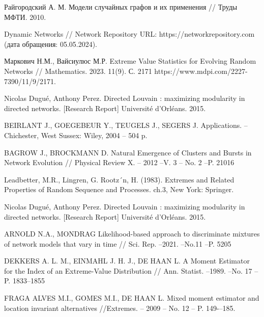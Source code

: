 \documentclass[a4paper,12pt]{article}
\begin{document}
\begin{thebibliography}{0}
 Райгородский А. М. Модели случайных графов и их применения // Труды МФТИ. 2010.

 Dynamic Networks // Network Repository URL: https://networkrepository.com (дата обращения: 05.05.2024).

 Маркович Н.М., Вайсиулюс М.Р. Extreme Value Statistics for Evolving Random Networks // Mathematics. 2023. 11(9). С. 2171 https://www.mdpi.com/2227-7390/11/9/2171.

 Nicolas Dugué, Anthony Perez. Directed Louvain : maximizing modularity in directed networks. [Research Report] Université d'Orléans. 2015.

 BEIRLANT J., GOEGEBEUR Y., TEUGELS J., SEGERS J. Applications. – Chichester, West Sussex: Wiley, 2004 – 504 p.

 BAGROW J., BROCKMANN D. Natural Emergence of Clusters and Bursts in Network Evolution // Physical Review X. – 2012 –V. 3 – No. 2 –P. 21016

 Leadbetter, M.R., Lingren, G. Rootz´n, H. (1983). Extremes and Related Properties of Random Sequence and Processes. ch.3, New York: Springer.


 Nicolas Dugué, Anthony Perez. Directed Louvain : maximizing modularity in directed networks. [Research Report] Université d'Orléans. 2015.

 ARNOLD N.A., MONDRAG Likelihood-based approach to discriminate mixtures of network models that vary in time // Sci. Rep. –2021. –No.11 –P. 5205

 DEKKERS A. L. M., EINMAHL J. H. J., DE HAAN L. A Moment Estimator for the Index of an Extreme-Value Distribution // Ann. Statist. –1989. –No. 17 –P. 1833–1855

 FRAGA ALVES M.I., GOMES M.I., DE HAAN L. Mixed moment estimator and location invariant alternatives //Extremes. – 2009 – No. 12 – P. 149-–185.



\end{thebibliography}
\end{document}

